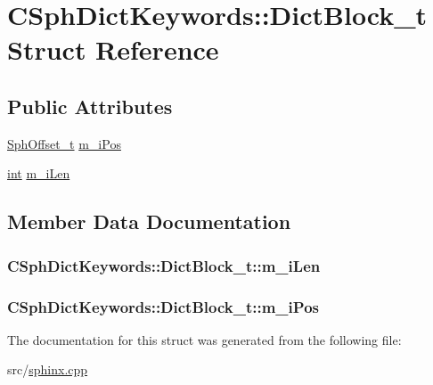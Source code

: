 \hypertarget{structCSphDictKeywords_1_1DictBlock__t}{\section{C\-Sph\-Dict\-Keywords\-:\-:Dict\-Block\-\_\-t Struct Reference}
\label{structCSphDictKeywords_1_1DictBlock__t}
}
\subsection*{Public Attributes}
\begin{DoxyCompactItemize}
\item 
\hyperlink{sphinx_8h_a0fb3b64afebef33c61367714754eaa90}{Sph\-Offset\-\_\-t} \hyperlink{structCSphDictKeywords_1_1DictBlock__t_a5acac90ee69032143e27e7d21ed655d7}{m\-\_\-i\-Pos}
\item 
\hyperlink{sphinxexpr_8cpp_a4a26e8f9cb8b736e0c4cbf4d16de985e}{int} \hyperlink{structCSphDictKeywords_1_1DictBlock__t_a80f15fcf39e86a3bb8d823dc15c549b2}{m\-\_\-i\-Len}
\end{DoxyCompactItemize}


\subsection{Member Data Documentation}
\hypertarget{structCSphDictKeywords_1_1DictBlock__t_a80f15fcf39e86a3bb8d823dc15c549b2}{
\subsubsection[{m\-\_\-i\-Len}]{ C\-Sph\-Dict\-Keywords\-::\-Dict\-Block\-\_\-t\-::m\-\_\-i\-Len}}\label{structCSphDictKeywords_1_1DictBlock__t_a80f15fcf39e86a3bb8d823dc15c549b2}
\hypertarget{structCSphDictKeywords_1_1DictBlock__t_a5acac90ee69032143e27e7d21ed655d7}{
\subsubsection[{m\-\_\-i\-Pos}]{ C\-Sph\-Dict\-Keywords\-::\-Dict\-Block\-\_\-t\-::m\-\_\-i\-Pos}}\label{structCSphDictKeywords_1_1DictBlock__t_a5acac90ee69032143e27e7d21ed655d7}


The documentation for this struct was generated from the following file\-:\begin{DoxyCompactItemize}
\item 
src/\hyperlink{sphinx_8cpp}{sphinx.\-cpp}\end{DoxyCompactItemize}
